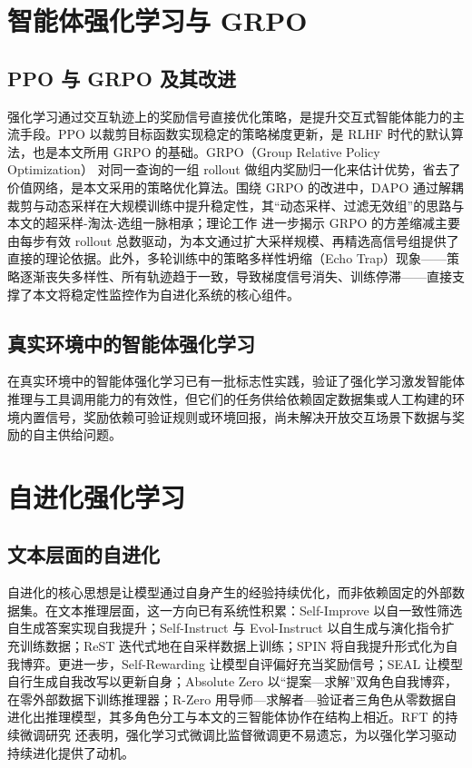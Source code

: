 \section{智能体强化学习与 GRPO}

\subsection{PPO 与 GRPO 及其改进}

强化学习通过交互轨迹上的奖励信号直接优化策略，是提升交互式智能体能力的主流手段。PPO 以裁剪目标函数实现稳定的策略梯度更新，是 RLHF 时代的默认算法，也是本文所用 GRPO 的基础。GRPO（Group Relative Policy Optimization） 对同一查询的一组 rollout 做组内奖励归一化来估计优势，省去了价值网络，是本文采用的策略优化算法。围绕 GRPO 的改进中，DAPO 通过解耦裁剪与动态采样在大规模训练中提升稳定性，其“动态采样、过滤无效组”的思路与本文的超采样-淘汰-选组一脉相承；理论工作 进一步揭示 GRPO 的方差缩减主要由每步有效 rollout 总数驱动，为本文通过扩大采样规模、再精选高信号组提供了直接的理论依据。此外，多轮训练中的策略多样性坍缩（Echo Trap）现象——策略逐渐丧失多样性、所有轨迹趋于一致，导致梯度信号消失、训练停滞——直接支撑了本文将稳定性监控作为自进化系统的核心组件。

\subsection{真实环境中的智能体强化学习}

在真实环境中的智能体强化学习已有一批标志性实践，验证了强化学习激发智能体推理与工具调用能力的有效性，但它们的任务供给依赖固定数据集或人工构建的环境内置信号，奖励依赖可验证规则或环境回报，尚未解决开放交互场景下数据与奖励的自主供给问题。

\section{自进化强化学习}

\subsection{文本层面的自进化}

自进化的核心思想是让模型通过自身产生的经验持续优化，而非依赖固定的外部数据集。在文本推理层面，这一方向已有系统性积累：Self-Improve 以自一致性筛选自生成答案实现自我提升；Self-Instruct 与 Evol-Instruct 以自生成与演化指令扩充训练数据；ReST 迭代式地在自采样数据上训练；SPIN 将自我提升形式化为自我博弈。更进一步，Self-Rewarding 让模型自评偏好充当奖励信号；SEAL 让模型自行生成自我改写以更新自身；Absolute Zero 以“提案—求解”双角色自我博弈，在零外部数据下训练推理器；R-Zero 用导师—求解者—验证者三角色从零数据自进化出推理模型，其多角色分工与本文的三智能体协作在结构上相近。RFT 的持续微调研究 还表明，强化学习式微调比监督微调更不易遗忘，为以强化学习驱动持续进化提供了动机。


